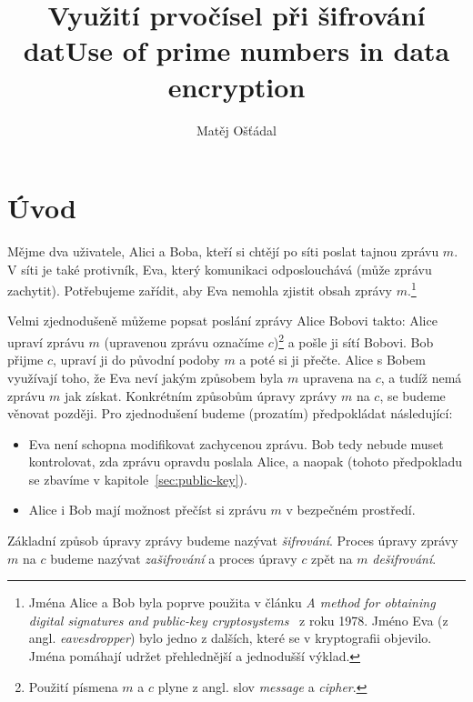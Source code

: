 \documentclass[
  program=infoi,
  biblatex=false,
  figures=true,
  glossaries,
  tables=false,
  sourcecodes=true,
  index
]{kidiplom}
\title{Využití prvočísel při šifrování dat}
\title[english]{Use of prime numbers in data encryption}
\author{Matěj Ošťádal}
\begin{document}
\maketitle




\section*{Úvod}

    Mějme dva uživatele, Alici a Boba, kteří si chtějí po síti poslat tajnou zprávu $m$.
    V síti je také protivník, Eva, který komunikaci odposlouchává (může zprávu zachytit). Potřebujeme zařídit, aby Eva
    nemohla zjistit obsah zprávy $m$.\footnote{Jména Alice a Bob byla poprve použita v článku \emph{A method for obtaining digital
    signatures and public-key cryptosystems}~\cite{rsa-original} z roku 1978.
    Jméno Eva (z angl. \emph{eavesdropper}) bylo jedno z dalších, které se v kryptografii objevilo.
    Jména pomáhají udržet přehlednější a jednodušší výklad.}

    Velmi zjednodušeně můžeme popsat poslání zprávy Alice Bobovi takto:
    Alice upraví zprávu $m$ (upravenou zprávu označíme $c$)\footnote{Použití písmena $m$ a $c$ plyne z angl. slov \emph{message} a \emph{cipher}.}
    a pošle ji sítí Bobovi.
    Bob přijme $c$, upraví ji do původní podoby $m$ a poté si ji přečte.
    Alice s Bobem využívají toho, že Eva neví jakým způsobem byla $m$ upravena na $c$, a tudíž nemá zprávu $m$ jak získat.
    Konkrétním způsobům úpravy zprávy $m$ na $c$, se budeme věnovat později.
    Pro zjednodušení budeme (prozatím) předpokládat následující:

    \begin{itemize}
        \item
            Eva není schopna modifikovat zachycenou zprávu.
            Bob tedy nebude muset kontrolovat, zda zprávu opravdu poslala Alice, a naopak
            (tohoto předpokladu se zbavíme v kapitole~\ref{sec:public-key}).
        \item
            Alice i Bob mají možnost přečíst si zprávu $m$ v bezpečném prostředí.
    \end{itemize}

    Základní způsob úpravy zprávy budeme nazývat \emph{šifrování}. Proces úpravy zprávy $m$ na $c$
    budeme nazývat \emph{zašifrování} a proces úpravy $c$ zpět na $m$ \emph{dešifrování}.
\end{document}
